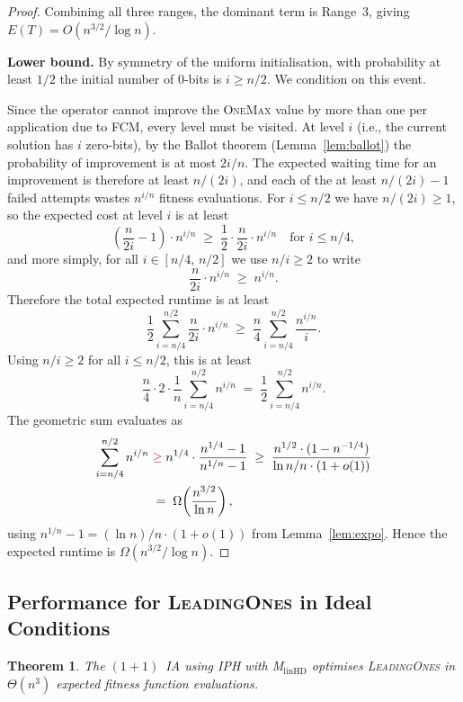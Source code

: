 \documentclass[lettersize,journal]{IEEEtran}
\newcommand{\rerev}[1]{\textcolor{purple}{#1}}
\newcommand{\oneoneIA}{$(1+1)$~IA}
\newcommand{\linHD}{M$_{\text{linHD}}$}
\newcommand{\IPHfcm}{IPH}
\newtheorem{theorem}{Theorem}
\begin{document}
\begin{proof}
Combining all three ranges, the dominant term is Range~3, giving $E(T)=O(n^{3/2}/\log n)$.

\medskip
\noindent\textbf{Lower bound.}
By symmetry of the uniform initialisation, with probability at least $1/2$ the initial number of 0-bits is $i\geq n/2$. We condition on this event.

Since the operator cannot improve the \textsc{OneMax} value by more than one per application due to FCM, every level must be visited. At level $i$ (i.e., the current solution has $i$ zero-bits), by the Ballot theorem (Lemma~\ref{lem:ballot}) the probability of improvement is at most $2i/n$. The expected waiting time for an improvement is therefore at least $n/(2i)$, and each of the at least $n/(2i)-1$ failed attempts wastes $n^{i/n}$ fitness evaluations. For $i\leq n/2$ we have $n/(2i)\geq 1$, so the expected cost at level $i$ is at least
\[
\left(\frac{n}{2i}-1\right)\cdot n^{i/n}
\;\geq\; \frac{1}{2}\cdot\frac{n}{2i}\cdot n^{i/n}
\quad\text{for }i\leq n/4,
\]
and more simply, for all $i\in[n/4,\,n/2]$ we use $n/i\geq 2$ to write
\[
\frac{n}{2i}\cdot n^{i/n}\;\geq\; n^{i/n}.
\]
Therefore the total expected runtime is at least
\[
\frac{1}{2}\sum_{i=n/4}^{n/2}\frac{n}{2i}\cdot n^{i/n}
\;\geq\; \frac{n}{4}\sum_{i=n/4}^{n/2}\frac{n^{i/n}}{i}.
\]
Using $n/i\geq 2$ for all $i\leq n/2$, this is at least
\[
\frac{n}{4}\cdot 2\cdot\frac{1}{n}\sum_{i=n/4}^{n/2} n^{i/n}
\;=\;\frac{1}{2}\sum_{i=n/4}^{n/2} n^{i/n}.
\]
The geometric sum evaluates as
\begin{align*}
\sum_{i=n/4}^{n/2} n^{i/n}
\;&\rerev{\geq}\; n^{1/4}\cdot\frac{n^{1/4}-1}{n^{1/n}-1}
\;\geq\; \frac{n^{1/2}\cdot(1-n^{-1/4})}{\ln n/n\cdot(1+o(1))}\\
\;&=\;\Omega\!\left(\frac{n^{3/2}}{\ln n}\right),
\end{align*}
using $n^{1/n}-1=(\ln n)/n\cdot(1+o(1))$ from Lemma~\ref{lem:expo}.
Hence the expected runtime is $\Omega(n^{3/2}/\log n)$.
\end{proof}


 


\subsection{Performance for \textsc{LeadingOnes} in Ideal Conditions}

\setcounter{theorem}{2}
\begin{theorem} 
The {\oneoneIA } using \IPHfcm{} with {\linHD } optimises \textsc{LeadingOnes} in $\Theta(n^3)$ expected fitness function evaluations.
\end{theorem}
\end{document}
